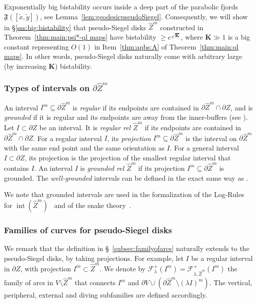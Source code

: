 \documentclass{amsart}
\newcommand{\1}{{\mathbb 1 }}
\newcommand{\Fam}{{\mathcal F}}
\newcommand\intr{\operatorname{int}}
\newcommand{\wZ}{{\widehat Z}}
\newcommand{\bK}{{\mathbf K}}
\theoremstyle{remark}
\numberwithin{equation}{section}
\theoremstyle{definition}
\newcommand{\Fjord}{{\mathfrak F}}
\begin{document}
Exponentially big bistability occurs inside a deep part of the parabolic fjords $\Fjord([\tilde x, \tilde y])$, see Lemma~\ref{lem:geodesicpseudoSiegel}. Consequently, we will show in \S\ref{sss:big:bistability} that pseudo-Siegel disks $\wZ^m$ constructed in Theorem~\ref{thm:main:psi*-ql maps} have bistability $\ge e^{\sqrt \bK}$, where $\bK\gg 1$ is a big constant representing $O(1)$ in Item~\ref{thm:apbs:A} of Theorem~\ref{thm:main:ql maps}. In other words, pseudo-Siegel disks naturally come with arbitrary large (by increasing $\bK$) bistability. 






\subsubsection{Types of intervals on $\partial\wZ^m$}\label{sss:intervalpsuedoSiegel}
An interval $I^m \subseteq \partial \wZ^m$ is {\em regular} if its endpoints are contained in $\partial \wZ^m \cap \partial Z$, and is {\em grounded} if it is regular and its endpoints are away from the inner-buffers (see \cite[\S~5.2.3]{DL22}). 
Let $I\subset \partial Z$ be an interval. It is  {\em regular rel $\wZ^m$} if its endpoints are contained in $\partial \wZ^m \cap \partial Z$.
For a regular interval $I$, its {\em projection} $I^m \subseteq \partial \wZ^m$ is the interval on $\partial \wZ^m$ with the same end point and the same orientation as $I$. For a general interval $I \subset\partial Z$, its projection is the projection of the smallest regular interval that contains $I$.
An interval $I$ is {\em grounded rel $\wZ^m$} if its projection $I^m \subseteq \partial \wZ^m$ is grounded. The {\em well-grounded} intervals can be defined in the exact same way as \cite[\S~5.2.2]{DL22}.




We note that grounded intervals are used in the formalization of the Log-Rules for $\intr(\wZ^m)$~\cite[\S5.3, \S5.4]{DL22} and of the snake theory~\cite[\S6]{DL22}.


\subsubsection{Families of curves for pseudo-Siegel disks}
We remark that the definition in \S~\ref{subsec:familyofarcs} naturally extends to the pseudo-Siegel disks, by taking projections.
For example, let $I$ be a regular interval in $\partial Z$, with projection $I^m \subset \wZ^m$.
We denote by $\Fam^{+}_\lambda(I^m) = \Fam^{+}_{\lambda, \wZ^m}(I^m)$ the family of arcs in $V \setminus \wZ^m$ that connects $I^m$ and $\partial V \cup (\partial \wZ^m \setminus (\lambda I)^m)$.
The vertical, peripheral, external and diving subfamilies are defined accordingly.
\end{document}
